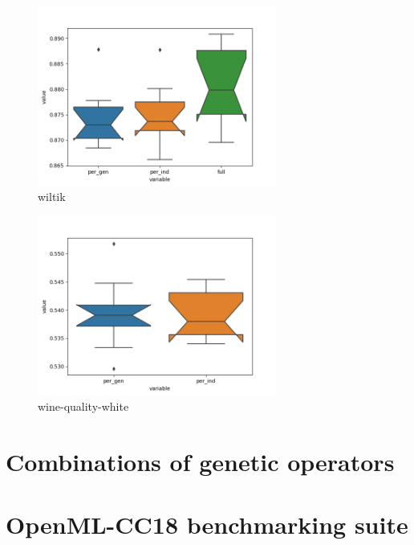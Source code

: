 \begin{figure}[ht]\centering
\includegraphics[width=0.7\textwidth]{../img/wilt-out.png}
\caption{wiltik}
\label{pic04:wilt}
\end{figure}

\begin{figure}[ht]\centering
\includegraphics[width=0.7\textwidth]{../img/winequality-out.png}
\caption{wine-quality-white}
\label{pic04:winequality}
\end{figure}








\section{Combinations of genetic operators} \label{sec:exp:genop}


\section{OpenML-CC18 benchmarking suite}
